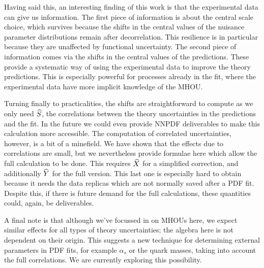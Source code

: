 Having said this, an interesting finding of this work is that the experimental data can give us information. The first piece of information is about the central scale choice, which survives because the shifts in the central values of the nuisance parameter distributions remain after decorrelation. This resilience is in particular because they are unaffected by functional uncertainty. The second piece of information comes via the shifts in the central values of the predictions. These provide a systematic way of using the experimental data to improve the theory predictions. This is especially powerful for processes already in the fit, where the experimental data have more implicit knowledge of the MHOU.

Turning finally to practicalities, the shifts are straightforward to compute as we only need $\widehat{S}$, the correlations between the theory uncertainties in the predictions and the fit. In the future we could even provide NNPDF deliverables to make this calculation more accessible.  The computation of correlated uncertainties, however, is a bit of a minefield. We have shown that the effects due to correlations are small, but we nevertheless provide formulae here which allow the full calculation to be done. This requires $\widehat{X}$ for a simplified correction, and additionally $\widehat{Y}$ for the full version. This last one is especially hard to obtain because it needs the data replicas which are not normally saved after a PDF fit. Despite this, if there is future demand for the full calculations, these quantities could, again, be deliverables.

A final note is that although we've focussed in on MHOUs here, we expect similar effects for all types of theory uncertainties; the algebra here is not dependent on their origin. This suggests a new technique for determining external parameters in PDF fits, for example $\alpha_s$ or the quark masses, taking into account the full correlations. We are currently exploring this possibility.  